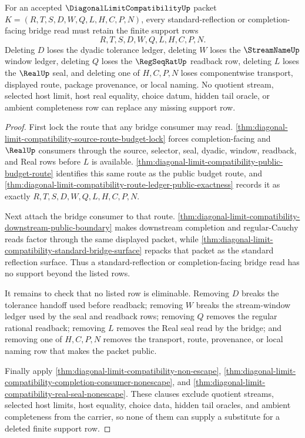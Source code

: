 \begin{theorem}
\label{thm:diagonal-limit-compatibility-bridge-support-minimality}
For an accepted $\DiagonalLimitCompatibilityUp$ packet $K=(R,T,S,D,W,Q,L,H,C,P,N)$, every standard-reflection or completion-facing bridge read must retain the finite support rows
$$
R,T,S,D,W,Q,L,H,C,P,N.
$$
Deleting $D$ loses the dyadic tolerance ledger, deleting $W$ loses the $\StreamNameUp$ window ledger, deleting $Q$ loses the $\RegSeqRatUp$ readback row, deleting $L$ loses the $\RealUp$ seal, and deleting one of $H,C,P,N$ loses componentwise transport, displayed route, package provenance, or local naming. No quotient stream, selected host limit, host real equality, choice datum, hidden tail oracle, or ambient completeness row can replace any missing support row.
\end{theorem}
\begin{proof}
First lock the route that any bridge consumer may read. \autoref{thm:diagonal-limit-compatibility-source-route-budget-lock} forces completion-facing and $\RealUp$ consumers through the source, selector, seal, dyadic, window, readback, and Real rows before $L$ is available. \autoref{thm:diagonal-limit-compatibility-public-budget-route} identifies this same route as the public budget route, and \autoref{thm:diagonal-limit-compatibility-route-ledger-public-exactness} records it as exactly $R,T,S,D,W,Q,L,H,C,P,N$.

Next attach the bridge consumer to that route. \autoref{thm:diagonal-limit-compatibility-downstream-public-boundary} makes downstream completion and regular-Cauchy reads factor through the same displayed packet, while \autoref{thm:diagonal-limit-compatibility-standard-bridge-surface} repacks that packet as the standard reflection surface. Thus a standard-reflection or completion-facing bridge read has no support beyond the listed rows.

It remains to check that no listed row is eliminable. Removing $D$ breaks the tolerance handoff used before readback; removing $W$ breaks the stream-window ledger used by the seal and readback rows; removing $Q$ removes the regular rational readback; removing $L$ removes the Real seal read by the bridge; and removing one of $H,C,P,N$ removes the transport, route, provenance, or local naming row that makes the packet public.

Finally apply \autoref{thm:diagonal-limit-compatibility-non-escape}, \autoref{thm:diagonal-limit-compatibility-completion-consumer-nonescape}, and \autoref{thm:diagonal-limit-compatibility-real-seal-nonescape}. These clauses exclude quotient streams, selected host limits, host equality, choice data, hidden tail oracles, and ambient completeness from the carrier, so none of them can supply a substitute for a deleted finite support row.
\end{proof}

